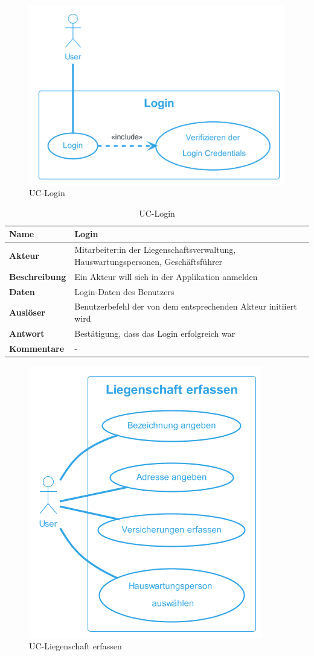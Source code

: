 
\begin{figure}[H]
  \begin{center}
    \includegraphics[width=0.6\linewidth]{content/diagrams/out/usecase/login/Login.png}
    \caption{UC-Login}
    \label{login}
  \end{center}
\end{figure}

\begin{table}[H]
  \centering
  \settowidth{}
  \setlength\extrarowheight{2pt}
  \begin{tabulary}{1.0\textwidth}{|a|m{14cm}|}
    \hline
    \textbf{Name}& Login\\
    \hline
    \textbf{Akteur}& Mitarbeiter:in der Liegenschaftsverwaltung, Hauswartungspersonen, Geschäftsführer\\
    \hline 
    \textbf{Beschreibung} & Ein Akteur will sich in der Applikation anmelden\\
    \hline
    \textbf{Daten} & Login-Daten des Benutzers\\
    \hline
    \textbf{Auslöser} & Benutzerbefehl der von dem entsprechenden Akteur initiiert wird\\
    \hline
    \textbf{Antwort} & Bestätigung, dass das Login erfolgreich war\\
    \hline
    \textbf{Kommentare} & -\\
    \hline
  \end{tabulary}
  \caption{UC-Login}
\end{table}

\begin{figure}[H]
  \begin{center}
    \includegraphics[width=0.43\linewidth]{content/diagrams/out/usecase/liegenschaftErfassen/LiegenschaftErfassen.png}
    \caption{UC-Liegenschaft erfassen}
    \label{Liegenschaft}
  \end{center}
\end{figure}

